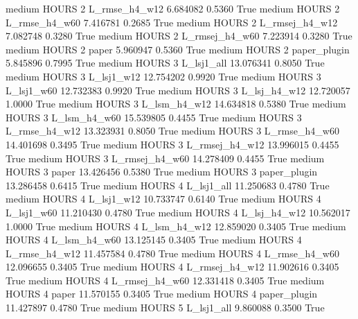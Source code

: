     medium    HOURS                 2  L_rmse_h4_w12   6.684082      0.5360    True
    medium    HOURS                 2  L_rmse_h4_w60   7.416781      0.2685    True
    medium    HOURS                 2 L_rmsej_h4_w12   7.082748      0.3280    True
    medium    HOURS                 2 L_rmsej_h4_w60   7.223914      0.3280    True
    medium    HOURS                 2          paper   5.960947      0.5360    True
    medium    HOURS                 2   paper_plugin   5.845896      0.7995    True
    medium    HOURS                 3     L_lsj1_all  13.076341      0.8050    True
    medium    HOURS                 3     L_lsj1_w12  12.754202      0.9920    True
    medium    HOURS                 3     L_lsj1_w60  12.732383      0.9920    True
    medium    HOURS                 3   L_lsj_h4_w12  12.720057      1.0000    True
    medium    HOURS                 3   L_lsm_h4_w12  14.634818      0.5380    True
    medium    HOURS                 3   L_lsm_h4_w60  15.539805      0.4455    True
    medium    HOURS                 3  L_rmse_h4_w12  13.323931      0.8050    True
    medium    HOURS                 3  L_rmse_h4_w60  14.401698      0.3495    True
    medium    HOURS                 3 L_rmsej_h4_w12  13.996015      0.4455    True
    medium    HOURS                 3 L_rmsej_h4_w60  14.278409      0.4455    True
    medium    HOURS                 3          paper  13.426456      0.5380    True
    medium    HOURS                 3   paper_plugin  13.286458      0.6415    True
    medium    HOURS                 4     L_lsj1_all  11.250683      0.4780    True
    medium    HOURS                 4     L_lsj1_w12  10.733747      0.6140    True
    medium    HOURS                 4     L_lsj1_w60  11.210430      0.4780    True
    medium    HOURS                 4   L_lsj_h4_w12  10.562017      1.0000    True
    medium    HOURS                 4   L_lsm_h4_w12  12.859020      0.3405    True
    medium    HOURS                 4   L_lsm_h4_w60  13.125145      0.3405    True
    medium    HOURS                 4  L_rmse_h4_w12  11.457584      0.4780    True
    medium    HOURS                 4  L_rmse_h4_w60  12.096655      0.3405    True
    medium    HOURS                 4 L_rmsej_h4_w12  11.902616      0.3405    True
    medium    HOURS                 4 L_rmsej_h4_w60  12.331418      0.3405    True
    medium    HOURS                 4          paper  11.570155      0.3405    True
    medium    HOURS                 4   paper_plugin  11.427897      0.4780    True
    medium    HOURS                 5     L_lsj1_all   9.860088      0.3500    True

